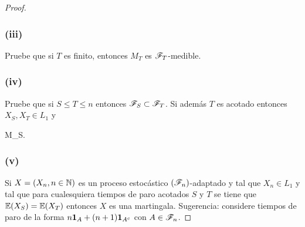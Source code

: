 \begin{proof}
	\subsubsection{(iii)}
		Pruebe que si $T$ es finito, entonces $M_T$ es $\mathscr{F}_T$-medible.
	
	\subsubsection{(iv)} 
		Pruebe que si $S\leq T\leq n$ entonces $\mathscr{F}_S\subset\mathscr{F}_T$. Si adem\'as $T$ es acotado entonces $X_S,X_T\in L_1$ y 
		\begin{esn}
			\leq M_S.
		\end{esn}

	\subsubsection{(v)}
		Si $X=\left( X_n,n\in\mathbb{N}\right) $ es un proceso estoc\'astico $\left( \mathscr{F}_n\right) $-adaptado y tal que $X_n\in L_1$ y tal que 
		para cualesquiera tiempos de paro acotados $S$ y $T$ se tiene que $\mathbb{E}\! \left( X_S \right)=\mathbb{E}\! \left( X_T \right)$ entonces $X$ es una 
		martingala. Sugerencia: considere tiempos de paro de la forma $n{\bf{1}}_{A}+(n+1){\bf{1}}_{A^c}$ con $A\in\mathscr{F}_n$.
\end{proof}